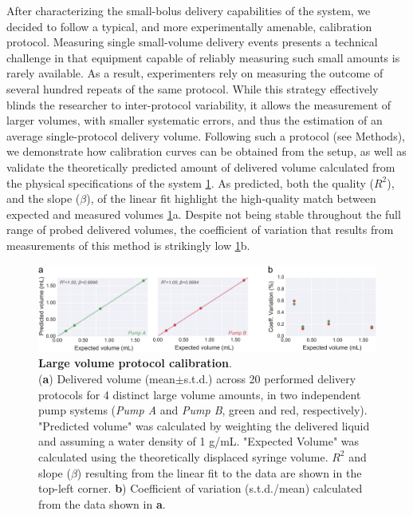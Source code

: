 After characterizing the small-bolus delivery capabilities of the system, we decided to follow a typical, and more experimentally amenable, calibration protocol. Measuring single small-volume delivery events presents a technical challenge in that equipment capable of reliably measuring such small amounts is rarely available. As a result, experimenters rely on measuring the outcome of several hundred repeats of the same protocol. While this strategy effectively blinds the researcher to inter-protocol variability, it allows the measurement of larger volumes, with smaller systematic errors, and thus the estimation of an average single-protocol delivery volume. Following such a protocol (see Methods), we demonstrate how calibration curves can be obtained from the setup, as well as validate the theoretically predicted amount of delivered volume calculated from the physical specifications of the system \ref{fig:LargeVolumeCalibration}. As predicted, both the quality  ($R^2$), and the slope ($\beta$), of the linear fit highlight the high-quality match between expected and measured volumes \ref{fig:LargeVolumeCalibration}a. Despite not being stable throughout the full range of probed delivered volumes, the coefficient of variation that results from measurements of this method is strikingly low \ref{fig:LargeVolumeCalibration}b. 

\begin{figure}[ht] 
	\centering
	\includegraphics[width=1.0\linewidth]{Figures/Artboard 6.pdf}
	\caption{\textbf{Large volume protocol calibration}.\\
		(\textbf{a}) Delivered volume (mean$\pm$s.t.d.) across 20 performed delivery protocols for 4 distinct large volume amounts, in two independent pump systems (\textit{Pump A} and \textit{Pump B}, green and red, respectively). "Predicted volume" was calculated by weighting the delivered liquid and assuming a water density of 1 g/mL. "Expected Volume" was calculated using the theoretically displaced syringe volume.  $R^{2}$ and slope ($\beta$) resulting from the linear fit to the data are shown in the top-left corner. \textbf{b}) Coefficient of variation (s.t.d./mean) calculated from the data shown in \textbf{a}.}
	\label{fig:LargeVolumeCalibration} 
\end{figure}

